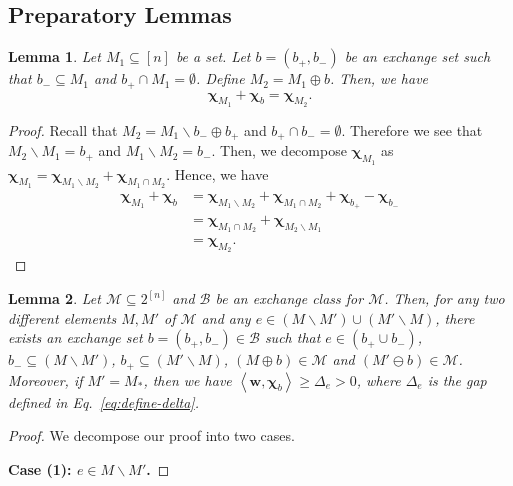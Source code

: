 \documentclass{article}
\newtheorem{lemma}{Lemma}
\newcommand{\M}{\mathcal M}
\newcommand{\B}{\mathcal B}
\newcommand{\del}{\backslash}
\DeclareMathOperator{\rad}{rad}
\newcommand{\inn}[1]{\left\langle #1 \right\rangle}
\renewcommand{\vec}[1]{\boldsymbol{#1}}
\begin{document}
\begin{spacing}{1.1}
\subsection{Preparatory Lemmas}


\begin{lemma}
Let $M_1 \subseteq [n]$ be a set.
Let $b=(b_+,b_-)$ be an exchange set such that 
$b_-\subseteq M_1$ and $b_+ \cap M_1 = \emptyset$.
Define $M_2 = M_1 \oplus b$.
Then, we have 
$$
\vec\chi_{M_1} +\vec\chi_{b} = \vec\chi_{M_2}.
$$
\label{lemma:exchange-char}
\end{lemma}

\begin{proof}
Recall that $M_2 = M_1 \del b_- \oplus b_+$ and $b_+\cap b_-=\emptyset$.
Therefore we see that $M_2 \del M_1 = b_+$ and $M_1 \del M_2 = b_-$.
Then, we decompose $\vec\chi_{M_1}$ as $\vec\chi_{M_1}=\vec\chi_{M_1\del M_2}+\vec\chi_{M_1\cap M_2}$.
Hence, we have
\begin{align*}
   \vec\chi_{M_1}+\vec\chi_{b} &= \vec\chi_{M_1\del M_2}+\vec\chi_{M_1\cap M_2} + \vec\chi_{b_+}-\vec\chi_{b_-}\\
   							   &= \vec\chi_{M_1\cap M_2} + \vec\chi_{M_2\del M_1}\\
   							   &= \vec\chi_{M_2}.
\end{align*}
\end{proof}


\begin{lemma}
\label{lemma:exchange}
Let $\M\subseteq 2^{[n]}$ and $\B$ be an exchange class for $\M$.
Then, for any two different elements $M,M'$ of $\M$ and any $e \in (M\del M')\cup(M'\del M)$, there exists an exchange set $b=(b_+,b_-) \in \B$ such that
$e\in (b_+\cup b_-)$, $b_-\subseteq (M\del M')$, $b_+\subseteq (M'\del M)$, 
$(M\oplus b) \in \M$ and  $(M'\ominus b) \in \M$.
Moreover, if $M' = M_*$, then we have $\inn{\vec w, \vec \chi_b} \ge \Delta_e > 0$,
where $\Delta_e$ is the gap defined in Eq.~\eqref{eq:define-delta}.
\end{lemma}

\begin{proof}
We decompose our proof into two cases.

\textbf{Case (1): $e\in M\del M'$.}


\end{proof}
\end{spacing}
\end{document}
